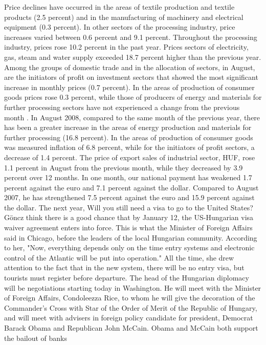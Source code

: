 Price declines have occurred in the areas of textile production and textile products (2.5 percent) and in the manufacturing of machinery and electrical equipment (0.3 percent).
In other sectors of the processing industry, price increases varied between 0.6 percent and 9.1 percent.
Throughout the processing industry, prices rose 10.2 percent in the past year.
Prices sectors of electricity, gas, steam and water supply exceeded 18.7 percent higher than the previous year.
Among the groups of domestic trade and in the allocation of sectors, in August, are the initiators of profit on investment sectors that showed the most significant increase in monthly prices (0.7 percent).
In the areas of production of consumer goods prices rose 0.3 percent, while those of producers of energy and materials for further processing sectors have not experienced a change from the previous month .
In August 2008, compared to the same month of the previous year, there has been a greater increase in the areas of energy production and materials for further processing (16.8 percent).
In the areas of production of consumer goods was measured inflation of 6.8 percent, while for the initiators of profit sectors, a decrease of 1.4 percent.
The price of export sales of industrial sector, HUF, rose 1.1 percent in August from the previous month, while they decreased by 3.9 percent over 12 months.
In one month, our national payment has weakened 1.7 percent against the euro and 7.1 percent against the dollar. Compared to August 2007, he has strengthened 7.5 percent against the euro and 15.9 percent against the dollar.
The next year, Will you still need a visa to go to the United States?
Göncz think there is a good chance that by January 12, the US-Hungarian visa waiver agreement enters into force. This is what the Minister of Foreign Affairs said in Chicago, before the leaders of the local Hungarian community.
According to her, "Now, everything depends only on the time entry systems and electronic control of the Atlantic will be put into operation."
All the time, she drew attention to the fact that in the new system, there will be no entry visa, but tourists must register before departure.
The head of the Hungarian diplomacy will be negotiations starting today in Washington.
He will meet with the Minister of Foreign Affairs, Condoleezza Rice, to whom he will give the decoration of the Commander's Cross with Star of the Order of Merit of the Republic of Hungary, and will meet with advisers in foreign policy candidate for president, Democrat Barack Obama and Republican John McCain.
Obama and McCain both support the bailout of banks
